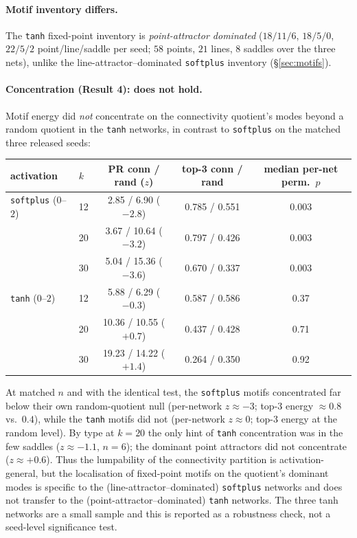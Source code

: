 \documentclass[11pt]{article}
\begin{document}
\paragraph{Motif inventory differs.} The \texttt{tanh} fixed-point inventory is
\emph{point-attractor dominated} ($18/11/6$, $18/5/0$, $22/5/2$ point/line/saddle per seed; $58$
points, $21$ lines, $8$ saddles over the three nets), unlike the line-attractor--dominated
\texttt{softplus} inventory (\S\ref{sec:motifs}).

\paragraph{Concentration (Result 4): does not hold.} Motif energy did \emph{not} concentrate on the
connectivity quotient's modes beyond a random quotient in the \texttt{tanh} networks, in contrast
to \texttt{softplus} on the matched three released seeds:
\begin{center}\small
\begin{tabular}{llccc}
\toprule
activation & $k$ & PR conn / rand ($z$) & top-3 conn / rand & median per-net perm.\ $p$ \\
\midrule
\texttt{softplus} ($0$--$2$) & 12 & 2.85 / 6.90 ($-2.8$) & 0.785 / 0.551 & 0.003 \\
                             & 20 & 3.67 / 10.64 ($-3.2$) & 0.797 / 0.426 & 0.003 \\
                             & 30 & 5.04 / 15.36 ($-3.6$) & 0.670 / 0.337 & 0.003 \\
\texttt{tanh} ($0$--$2$)     & 12 & 5.88 / 6.29 ($-0.3$) & 0.587 / 0.586 & 0.37 \\
                             & 20 & 10.36 / 10.55 ($+0.7$) & 0.437 / 0.428 & 0.71 \\
                             & 30 & 19.23 / 14.22 ($+1.4$) & 0.264 / 0.350 & 0.92 \\
\bottomrule
\end{tabular}
\end{center}
At matched $n$ and with the identical test, the \texttt{softplus} motifs concentrated far below
their own random-quotient null (per-network $z\approx-3$; top-3 energy $\approx0.8$ vs.\ $0.4$),
while the \texttt{tanh} motifs did not (per-network $z\approx0$; top-3 energy at the random level).
By type at $k=20$ the only hint of \texttt{tanh} concentration was in the few saddles
($z\approx-1.1$, $n=6$); the dominant point attractors did not concentrate ($z\approx+0.6$). Thus
the lumpability of the connectivity partition is activation-general, but the localisation of
fixed-point motifs on the quotient's dominant modes is specific to the (line-attractor--dominated)
\texttt{softplus} networks and does not transfer to the (point-attractor--dominated) \texttt{tanh}
networks. The three tanh networks are a small sample and this is reported as a robustness check,
not a seed-level significance test.
\end{document}
